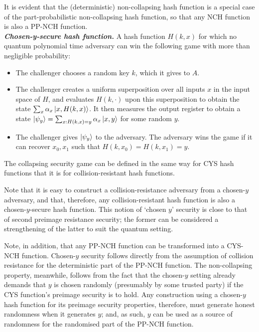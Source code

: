 \documentclass{article}
\begin{document}
It is evident that the (deterministic) non-collapsing hash function is a special case of the part-probabilistic non-collapsing hash function, so that any NCH function is also a PP-NCH function.\\

\noindent \textbf{\textit{Chosen-y-secure hash function.}} A hash function $H(k, x)$ for which no quantum polynomial time adversary can win the following game with more than negligible probability:
\begin{itemize}
    \item The challenger chooses a random key $k$, which it gives to $A$.
    \item The challenger creates a uniform superposition over all inputs $x$ in the input space of $H$, and evaluates $H(k, \cdot)$ upon this superposition to obtain the state $\sum_x \alpha_x \ket{x, H(k, x)}$. It then measures the output register to obtain a state $\ket{\psi_y} = \sum_{x : H(k, x) = y} \alpha_x \ket{x, y}$ for some random $y$.
    \item The challenger gives $\ket{\psi_y}$ to the adversary. The adversary wins the game if it can recover $x_0, x_1$ such that $H(k, x_0) = H(k, x_1) = y$.
\end{itemize}

The collapsing security game can be defined in the same way for CYS hash functions that it is for collision-resistant hash functions.

Note that it is easy to construct a collision-resistance adversary from a chosen-$y$ adversary, and that, therefore, any collision-resistant hash function is also a chosen-$y$-secure hash function. This notion of `chosen $y$' security is close to that of second preimage resistance security; the former can be considered a strengthening of the latter to suit the quantum setting.

Note, in addition, that any PP-NCH function can be transformed into a CYS-NCH function. Chosen-$y$ security follows directly from the assumption of collision resistance for the deterministic part of the PP-NCH function. The non-collapsing property, meanwhile, follows from the fact that the chosen-$y$ setting already demands that $y$ is chosen randomly (presumably by some trusted party) if the CYS function's preimage security is to hold. Any construction using a chosen-$y$ hash function for its preimage security properties, therefore, must generate honest randomness when it generates $y$; and, as such, $y$ can be used as a source of randomness for the randomised part of the PP-NCH function.
\end{document}
